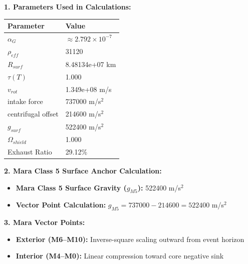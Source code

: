 \documentclass[11pt, a4paper]{article}
\begin{document}
\vspace{0.5em}
\noindent \textbf{1. Parameters Used in Calculations:}
\begin{center}
  \begin{tabular}{|l|l|}
    \hline
    \textbf{Parameter} & \textbf{Value} \\ \hline
    $\alpha_G$ & $\approx 2.792 \times 10^{-7}$ \\ \hline
    $\rho_{eff}$ & 31120 \\ \hline
    $R_{surf}$ & 8.48134e+07 km \\ \hline
    $\tau(T)$ & 1.000 \\ \hline
    $v_{rot}$ & 1.349e+08 m/s \\ \hline
    intake force & 737000 m/s$^2$ \\ \hline
    centrifugal offset & 214600 m/s$^2$ \\ \hline
    $g_{surf}$ & 522400 m/s$^2$ \\ \hline
    $\Omega_{shield}$ & 1.000 \\ \hline
    Exhaust Ratio & 29.12\% \\ \hline
  \end{tabular}
\end{center}

\vspace{0.5em}
\noindent \textbf{2. Mara Class 5 Surface Anchor Calculation:}
\begin{itemize}
  \item \textbf{Mara Class 5 Surface Gravity ($g_{M5}$):} 522400 m/s$^2$
  \item \textbf{Vector Point Calculation:} $g_{M5} = 737000 - 214600 = 522400$ m/s$^2$
\end{itemize}

\vspace{0.5em}
\noindent \textbf{3. Mara Vector Points:}
\begin{itemize}
  \item \textbf{Exterior (M6--M10):} Inverse-square scaling outward from event horizon
  \item \textbf{Interior (M4--M0):} Linear compression toward core negative sink
\end{itemize}
\end{document}
